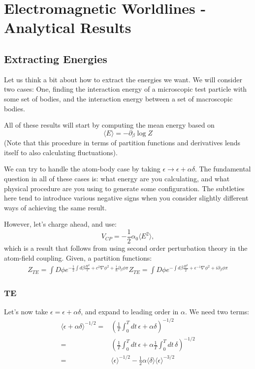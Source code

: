 \chapter{Electromagnetic Worldlines - Analytical Results}
\label{ch:analytical}
\section{Extracting Energies}

Let us think a bit about how to extract the energies we want.
  We will consider two cases: 
 One, finding the interaction energy of a microscopic test particle with some set of bodies,
 and the interaction energy between a set of macroscopic bodies. 

All of these results will start by computing the mean energy based on 
\begin{equation}
\langle E\rangle = -\partial_\beta\log Z
\end{equation}
(Note that this procedure in terms of partition functions and derivatives lends itself to also calculating fluctuations).  

We can try to handle the atom-body case by taking $\epsilon \rightarrow \epsilon + \alpha\delta$.
  The fundamental question in all of these cases is: what energy are you calculating, 
and what physical procedure are you using to generate some configuration.
  The subtleties here tend to introduce various negative signs when you consider slightly different ways of achieving the same result.  

However, let's charge ahead, and use: 
\begin{equation}
V_{CP} = -\frac{1}{2}\alpha_0\langle E^2\rangle,
\end{equation}
which is a result that follows from using second order perturbation theory in the atom-field coupling.
  Given, a partition functions: 
\begin{align}
Z_{TE} = \int D\phi e^{-\frac{1}{2}\int d\beta \frac{\Pi^2}{\epsilon} + c^2\nabla\phi^2+\frac{i}{\hbar}\partial_\beta\phi \pi  }
Z_{TE} = \int D\phi e^{-\int d\beta \frac{\Pi^2}{2} + \epsilon^{-1}\nabla\phi^2+i\partial_\beta\phi \pi  }
\end{align}

\subsection{TE}
Let's now take $\epsilon = \epsilon+\alpha\delta$, and expand to leading order in $\alpha.$  
We need two terms:
\begin{align}
\langle\epsilon+\alpha\delta\rangle^{-1/2} =&  \left(\frac{1}{T}\int_0^Tdt\,\epsilon + \alpha\delta\right)^{-1/2}\\
=& \left(\frac{1}{T}\int_0^Tdt\,\epsilon + \alpha\frac{1}{T}\int_0^Tdt\,\delta\right)^{-1/2}\\
=& \langle\epsilon\rangle^{-1/2} -\frac{1}{2}\alpha\langle\delta\rangle\langle\epsilon\rangle^{-3/2}
\end{align}
